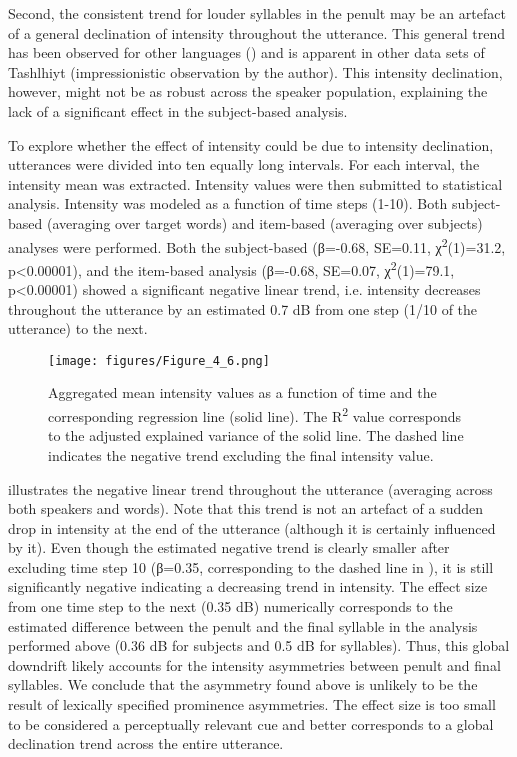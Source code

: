 Second, the consistent trend for louder syllables in the penult may be an artefact of a general declination of intensity throughout the utterance. This general trend has been observed for other languages (\citealt{Ladefoged1972,LiebermanBlumstein1988,VayraFowler1992}) and is apparent in other data sets of Tashlhiyt (impressionistic observation by the author). This intensity declination, however, might not be as robust across the speaker population, explaining the lack of a significant effect in the subject-based analysis. 

To explore whether the effect of intensity could be due to intensity declination, utterances were divided into ten equally long intervals. For each interval, the intensity mean was extracted. Intensity values were then submitted to statistical analysis. Intensity was modeled as a function of time steps (1-10). Both subject-based (averaging over target words) and item-based (averaging over subjects) analyses were performed. Both the subject-based (β=-0.68, SE=0.11, χ\textsuperscript{2}(1)=31.2, p<0.00001), and the item-based analysis (β=-0.68, SE=0.07, χ\textsuperscript{2}(1)=79.1, p<0.00001) showed a significant negative linear trend, i.e. intensity decreases throughout the utterance by an estimated 0.7 dB from one step (1/10 of the utterance) to the next.

\begin{figure}
  \centering 
   \texttt{[image: figures/Figure\_4\_6.png]}
  \caption{Aggregated mean intensity values as a function of time and the corresponding regression line (solid line). The R\textsuperscript{2} value corresponds to the adjusted explained variance of the solid line. The dashed line indicates the negative trend excluding the final intensity value.}
   \label{fig:4.6}
   \end{figure}

 illustrates the negative linear trend throughout the utterance (averaging across both speakers and words). Note that this trend is not an artefact of a sudden drop in intensity at the end of the utterance (although it is certainly influenced by it). Even though the estimated negative trend is clearly smaller after excluding time step 10 (β=0.35, corresponding to the dashed line in ), it is still significantly negative indicating a decreasing trend in intensity. The effect size from one time step to the next (0.35 dB) numerically corresponds to the estimated difference between the penult and the final syllable in the analysis performed above (0.36 dB for subjects and 0.5 dB for syllables). Thus, this global downdrift likely accounts for the intensity asymmetries between penult and final syllables. We conclude that the asymmetry found above is unlikely to be the result of lexically specified prominence asymmetries. The effect size is too small to be considered a perceptually relevant cue and better corresponds to a global declination trend across the entire utterance.


